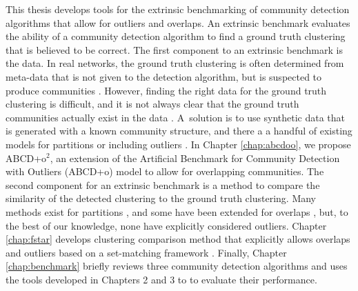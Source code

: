 \documentclass[review,los,12pt]{ryethesis}
\newcommand{\abcdo}{{ABCD+o}}
\newcommand{\abcdoo}{{ABCD+o$^2$}}
\begin{document}
This thesis develops tools for the extrinsic benchmarking of community detection algorithms that allow for outliers and overlaps.
An extrinsic benchmark evaluates the ability of a community detection algorithm to find a ground truth clustering that is believed to be correct.
The first component to an extrinsic benchmark is the data.
In real networks, the ground truth clustering is often determined from meta-data that is not given to the detection algorithm, but is suspected to produce communities \cite{snap}.
However, finding the right data for the ground truth clustering is difficult, and it is not always clear that the ground truth communities actually exist in the data \cite{yang2012defining}.
A~solution is to use synthetic data that is generated with a known community structure, and there a a handful of existing models for partitions \cite{lfr,abcd} or including outliers \cite{abcdo}. 
In Chapter \ref{chap:abcdoo}, we propose \abcdoo, an extension of the Artificial Benchmark for Community Detection with Outliers (\abcdo) model \cite{abcdo,abcd} to allow for overlapping communities. 
The second component for an extrinsic benchmark is a method to compare the similarity of the detected clustering to the ground truth clustering.
Many methods exist for partitions \cite{ari,vi,nmi,ami}, and some have been extended for overlaps \cite{omega,onmi,ecc}, but, to the best of our knowledge, none have explicitly considered outliers.
Chapter \ref{chap:fstar} develops clustering comparison method that explicitly allows overlaps and outliers based on a set-matching framework \cite{setmatching}.
Finally, Chapter \ref{chap:benchmark} briefly reviews three community detection algorithms \cite{hslc,cas,oslom} and uses the tools developed in Chapters 2 and 3 to to evaluate their performance.
\end{document}
